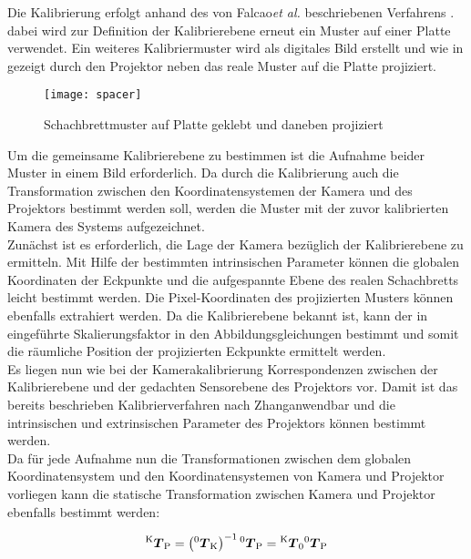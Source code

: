 Die Kalibrierung erfolgt anhand des von Falcao\red[Groß?] \textit{et al.} beschriebenen Verfahrens \cite{Falcao2008}. dabei wird zur Definition der Kalibrierebene erneut ein Muster auf einer Platte verwendet. Ein weiteres Kalibriermuster wird als digitales Bild erstellt und wie in  gezeigt durch den Projektor neben das reale Muster auf die Platte projiziert.

\begin{figure}[ht]
	\begin{center}
		\texttt{[image: spacer]}
		\caption{Schachbrettmuster auf Platte geklebt und daneben projiziert}
		\label{fig.projcalib}
	\end{center}
\end{figure}

Um die gemeinsame Kalibrierebene zu bestimmen ist die Aufnahme beider Muster in einem Bild erforderlich. Da durch die Kalibrierung auch die Transformation zwischen den Koordinatensystemen der Kamera und des Projektors bestimmt werden soll, werden die Muster mit der zuvor kalibrierten Kamera des Systems aufgezeichnet.\\
Zunächst ist es erforderlich, die Lage der Kamera bezüglich der Kalibrierebene zu ermitteln. Mit Hilfe der bestimmten intrinsischen Parameter können die globalen Koordinaten der Eckpunkte und die aufgespannte Ebene des realen Schachbretts leicht bestimmt werden. Die Pixel-Koordinaten des projizierten Musters können ebenfalls extrahiert werden. Da die Kalibrierebene bekannt ist, kann der in  eingeführte Skalierungsfaktor in den Abbildungsgleichungen bestimmt und somit die räumliche Position der projizierten Eckpunkte ermittelt werden.\\

Es liegen nun wie bei der Kamerakalibrierung Korrespondenzen zwischen der Kalibrierebene und der gedachten Sensorebene des Projektors vor. Damit ist das bereits beschrieben Kalibrierverfahren nach Zhang\red[Groß?] anwendbar und die intrinsischen und extrinsischen Parameter des Projektors können bestimmt werden.\\
Da für jede Aufnahme nun die Transformationen zwischen dem globalen Koordinatensystem und den Koordinatensystemen von Kamera und Projektor vorliegen kann die statische Transformation zwischen Kamera und Projektor ebenfalls bestimmt werden:

\begin{equation}
{^{\mathrm{K}}\mbox{\boldmath{$T$}}_{\mathrm{P}}} = \left( {^{\mathrm{0}}\mbox{\boldmath{$T$}}_{\mathrm{K}}} \right)^{-1} {^{\mathrm{0}}\mbox{\boldmath{$T$}}_{\mathrm{P}}} = {^{\mathrm{K}}\mbox{\boldmath{$T$}}_{\mathrm{0}}} {^{\mathrm{0}}\mbox{\boldmath{$T$}}_{\mathrm{P}}}
\end{equation}

